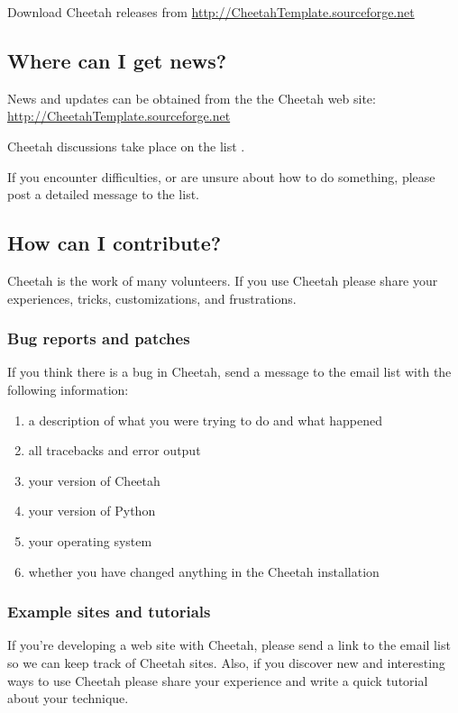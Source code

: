 Download Cheetah releases from
\url{http://CheetahTemplate.sourceforge.net}

\subsection{Where can I get news?}
\label{intro.news}

News and updates can be obtained from the the Cheetah web site:
\url{http://CheetahTemplate.sourceforge.net}

Cheetah discussions take place on the list
.

If you encounter difficulties, or are unsure about how to do something,
please post a detailed message to the list.

\subsection{How can I contribute?}
\label{intro.contribute}

Cheetah is the work of many volunteers.  If you use Cheetah please share your
experiences, tricks, customizations, and frustrations.

\subsubsection{Bug reports and patches}

If you think there is a bug in Cheetah, send a message to the email list
with the following information:

\begin{enumerate}
\item a description of what you were trying to do and what happened
\item all tracebacks and error output
\item your version of Cheetah
\item your version of Python
\item your operating system
\item whether you have changed anything in the Cheetah installation
\end{enumerate}

\subsubsection{Example sites and tutorials}
If you're developing a web site with Cheetah, please send a link to the
email list so we can keep track of Cheetah sites.  Also, if you discover
new and interesting ways to use Cheetah please share your experience and
write a quick tutorial about your technique.

